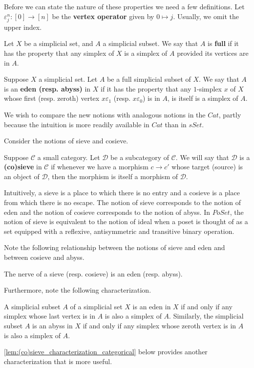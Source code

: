Before we can state the nature of these properties we need a few definitions. Let $\varepsilon ^n_j:[0]\to [n]$ be the \textbf{vertex operator} given by $0\mapsto j$. Usually, we omit the upper index.
\begin{definition}
Let $X$ be a simplicial set, and $A$ a simplicial subset. We say that $A$ is \textbf{full} if it has the property that any simplex of $X$ is a simplex of $A$ provided its vertices
are in $A$.
\end{definition}
\begin{definition}
Suppose $X$ a simplicial set. Let $A$ be a full simplicial subset of $X$. We say that $A$ is an \textbf{eden (resp. abyss)} in $X$ if it has the property that any $1$-simplex $x$ of $X$ whose first (resp. zeroth) vertex $x\varepsilon _1$ (resp. $x\varepsilon _0$) is in $A$, is itself is a simplex of $A$.
\end{definition}
\noindent We wish to compare the new notions with analogous notions in the $Cat$, partly because the intuition is more readily available in $Cat$ than in $sSet$.

Consider the notions of sieve and cosieve.
\begin{definition}
Suppose $\mathscr{C}$ a small category. Let $\mathscr{D}$ be a subcategory of $\mathscr{C}$. We will say that $\mathscr{D}$ is a \textbf{(co)sieve} in $\mathscr{C}$ if whenever we have a morphism $c\to c'$ whose target (source) is an object of $\mathscr{D}$, then the morphism is itself a morphism of $\mathscr{D}$.
\end{definition}
\noindent Intuitively, a sieve is a place to which there is no entry and a cosieve is a place from which there is no escape. The notion of sieve corresponds to the notion of eden and the notion of cosieve corresponds to the notion of abyss. In $PoSet$, the notion of sieve is equivalent to the notion of ideal when a poset is thought of as a set equipped with a reflexive, antisymmetric and transitive binary operation.

Note the following relationship between the notions of sieve and eden and between cosieve and abyss.
\begin{lemma}\label{lem:nerve_of_(co)sieve}
The nerve of a sieve (resp. cosieve) is an eden (resp. abyss).
\end{lemma}
\noindent Furthermore, note the following characterization.
\begin{lemma}\label{lem:(co)sieve_characterization_elementary}
A simplicial subset $A$ of a simplicial set $X$ is an eden in $X$ if and only if any simplex whose last vertex is in $A$ is also a simplex of $A$. Similarly, the simplicial subset $A$ is an abyss in $X$ if and only if any simplex whose zeroth vertex is in $A$ is also a simplex of $A$.
\end{lemma}
\noindent \cref{lem:(co)sieve_characterization_categorical} below provides another characterization that is more useful.

